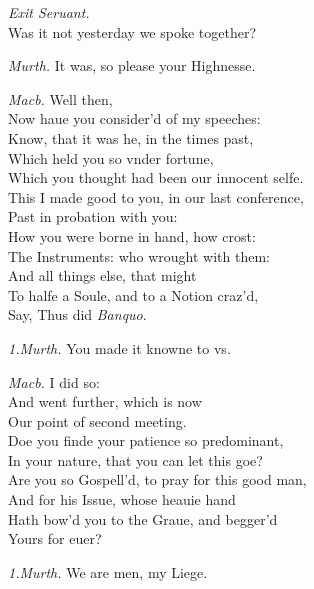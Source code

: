 \documentclass[12pt]{sides}
\newcommand{\elStageDir}[1]{\hfill\textit{#1}}
\newcommand{\dia}[1]{\hskip 15pt\textit{#1}\hskip 6pt}
\begin{document}
\begin{multicols}{2}
            \elStageDir{Exit Seruant.} \hspace{32pt} \\ Was it not yesterday we spoke together?

            \dia{Murth.} It was, so please your Highnesse.

            \dia{Macb.} Well then, \\ Now haue you consider'd of my speeches: \\ Know, that it was he, in the times past, \\ Which held you so vnder fortune, \\ Which you thought had been our innocent selfe. \\ This I made good to you, in our last conference, \\ Past in probation with you: \\ How you were borne in hand, how crost: \\ The Instruments: who wrought with them: \\ And all things else, that might \\ To halfe a Soule, and to a Notion craz'd, \\ Say, Thus did \textit{Banquo}.

            \dia{1.Murth.} You made it knowne to vs.

            \dia{Macb.} I did so: \\ And went further, which is now \\ Our point of second meeting. \\ Doe you finde your patience so predominant, \\ In your nature, that you can let this goe? \\ Are you so Gospell'd, to pray for this good man, \\ And for his Issue, whose heauie hand \\ Hath bow'd you to the Graue, and begger'd \\ Yours for euer?

            \dia{1.Murth.} We are men, my Liege.


\end{multicols}
\end{document}
